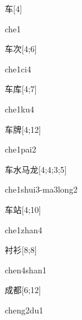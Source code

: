 \begin{verbete}[che1]{车}[4]
\begin{pronuncia}{che1}
\end{pronuncia}
\end{verbete}

\begin{verbete}[che1ci4]{车次}[4;6]
\begin{pronuncia}{che1ci4}
\end{pronuncia}
\end{verbete}

\begin{verbete}[che1ku4]{车库}[4;7]
\begin{pronuncia}{che1ku4}
\end{pronuncia}
\end{verbete}

\begin{verbete}{车牌}[4;12]
\begin{pronuncia}{che1pai2}
\end{pronuncia}
\end{verbete}

\begin{verbete}{车水马龙}[4;4;3;5]
\begin{pronuncia}[\\]{che1shui3-ma3long2}
\end{pronuncia}
\end{verbete}

\begin{verbete}{车站}[4;10]
\begin{pronuncia}{che1zhan4}
\end{pronuncia}
\end{verbete}

\begin{verbete}{衬衫}[8;8]
\begin{pronuncia}{chen4shan1}
\end{pronuncia}
\end{verbete}

\begin{verbete}[cheng2du1]{成都}[6;12]
\begin{pronuncia}{cheng2du1}
\end{pronuncia}
\end{verbete}

